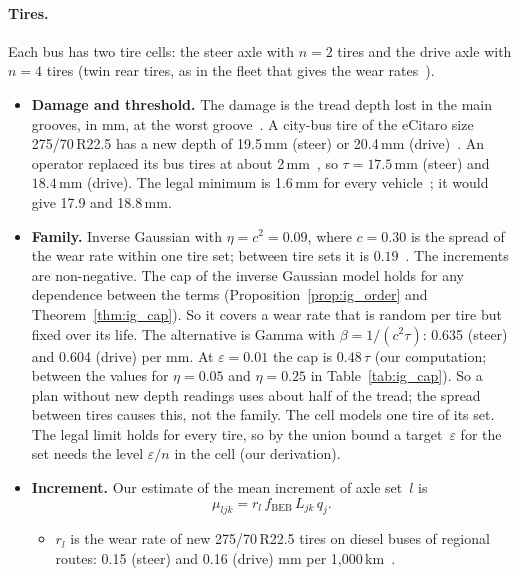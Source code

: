 \documentclass[11pt,a4paper]{article}
\theoremstyle{plain}
\theoremstyle{definition}
\theoremstyle{remark}
\begin{document}
\paragraph{Tires.}
Each bus has two tire cells: the steer axle with $n = 2$ tires and the drive axle with $n = 4$ tires (twin rear tires, as in the fleet that gives the wear rates~\cite[Sec.~2]{Giechaskiel2026bus}).
\begin{itemize}
  \item \textbf{Damage and threshold.}
    The damage is the tread depth lost in the main grooves, in mm, at the worst groove~\cite[Sec.~2]{Giechaskiel2026bus}.
    A city-bus tire of the eCitaro size 275/70\,R22.5 has a new depth of 19.5\,mm (steer) or 20.4\,mm (drive)~\cite[p.~38]{Goodyear2020}.
    An operator replaced its bus tires at about 2\,mm~\cite[Sec.~2]{Giechaskiel2026bus}, so $\tau = 17.5$\,mm (steer) and $18.4$\,mm (drive).
    The legal minimum is 1.6\,mm for every vehicle~\cite[Art.~58 para.~4]{VTS2026}; it would give 17.9 and 18.8\,mm.
  \item \textbf{Family.}
    Inverse Gaussian with $\eta = c^2 = 0.09$, where $c = 0.30$ is the spread of the wear rate within one tire set; between tire sets it is $0.19$~\cite[p.~6]{Giechaskiel2026bus}.
    The increments are non-negative.
    The cap of the inverse Gaussian model holds for any dependence between the terms (Proposition~\ref{prop:ig_order} and Theorem~\ref{thm:ig_cap}).
    So it covers a wear rate that is random per tire but fixed over its life.
    The alternative is Gamma with $\beta = 1/(c^2\tau)$: 0.635 (steer) and 0.604 (drive) per mm.
    At $\varepsilon = 0.01$ the cap is $0.48\,\tau$ (our computation; between the values for $\eta = 0.05$ and $\eta = 0.25$ in Table~\ref{tab:ig_cap}).
    So a plan without new depth readings uses about half of the tread; the spread between tires causes this, not the family.
    The cell models one tire of its set.
    The legal limit holds for every tire, so by the union bound a target~$\varepsilon$ for the set needs the level $\varepsilon/n$ in the cell (our derivation).
  \item \textbf{Increment.}
    Our estimate of the mean increment of axle set~$l$ is
    \begin{equation}\label{eq:cs_tire}
      \mu_{ljk} = r_l\, f_{\mathrm{BEB}}\, L_{jk}\, q_j .
    \end{equation}
    \begin{itemize}
      \item $r_l$ is the wear rate of new 275/70\,R22.5 tires on diesel buses of regional routes: 0.15 (steer) and 0.16 (drive) mm per 1,000\,km~\cite[Table~6]{Giechaskiel2026bus}.

\end{itemize}
\end{itemize}
\end{document}
